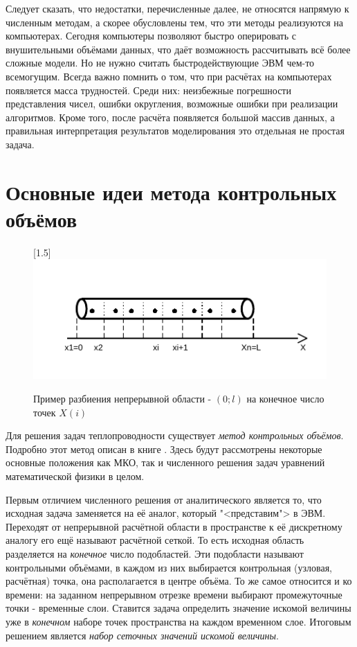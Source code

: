 \documentclass[oneside, final, 14pt]{report}
\begin{document}
Следует сказать, что недостатки, перечисленные далее, не относятся напрямую к численным методам, а скорее обусловлены тем, что эти методы реализуются на компьютерах. Сегодня компьютеры позволяют быстро оперировать с внушительными объёмами данных, что даёт возможность рассчитывать всё более сложные модели. Но не нужно считать быстродействующие ЭВМ чем-то всемогущим. Всегда важно помнить о том, что при расчётах на компьютерах появляется масса трудностей. Среди них: неизбежные погрешности представления чисел, ошибки округления, возможные ошибки при реализации алгоритмов. Кроме того, после расчёта появляется большой массив данных, а правильная интерпретация результатов моделирования это отдельная не простая задача. 
\section{Основные идеи метода контрольных объёмов}
\begin{figure}[h!]
    \centering
    \scalebox{2}[1.5]{\includegraphics{../img_pdf_cropped/mesh_example}}
    \caption{Пример разбиения непрерывной области - $(0; l)$ на конечное число точек $X(i)$}
    \label{img_mesh_example}
\end{figure}


Для решения задач теплопроводности существует \emph{метод контрольных объёмов}. Подробно этот метод описан в книге \cite{bib:Patankar}. Здесь будут рассмотрены некоторые основные положения как МКО, так и численного решения задач уравнений математической физики в целом. 


Первым отличием численного решения от аналитического является то, что исходная задача заменяется на её аналог, который "<представим"> в ЭВМ. Переходят от непрерывной расчётной области в пространстве к её дискретному аналогу его ещё называют расчётной сеткой. То есть исходная область разделяется на \emph{конечное} число подобластей. Эти подобласти называют контрольными объёмами, в каждом из них выбирается контрольная (узловая, расчётная) точка, она располагается в центре объёма. То же самое относится и ко времени: на заданном непрерывном отрезке времени выбирают промежуточные точки - временные слои. Ставится задача определить значение искомой величины уже в \emph{конечном} наборе точек пространства на каждом временном слое. Итоговым решением является \emph{набор сеточных значений искомой величины}. 
\end{document}
